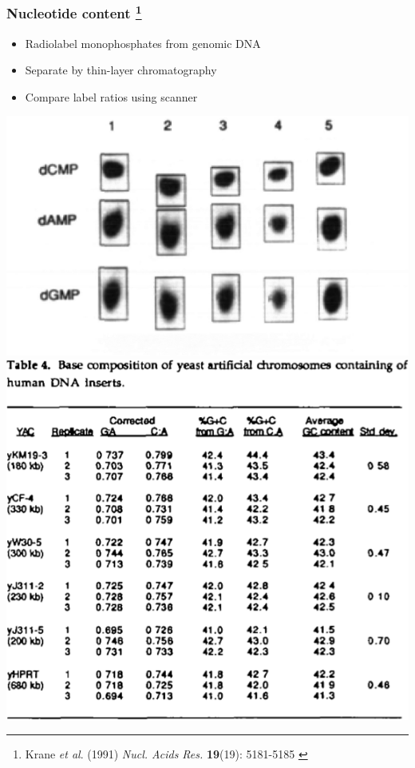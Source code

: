 %
\begin{frame}
  \frametitle{Nucleotide content
  \footnote{\tiny{Krane \textit{et al}. (1991) \textit{Nucl. Acids Res.} \textbf{19}(19): 5181-5185
}}
  }
  \begin{itemize}
    \item \textcolor{hutton_green}{Radiolabel monophosphates from genomic DNA}
    \item \textcolor{hutton_blue}{Separate by thin-layer chromatography}
    \item \textcolor{hutton_purple}{Compare label ratios using scanner}    
  \end{itemize}
  \begin{center}
    \includegraphics[height=0.4\textheight]{images/nucleotide_tlc}
    \includegraphics[height=0.4\textheight]{images/nucleotide_table}    
  \end{center}  
\end{frame}